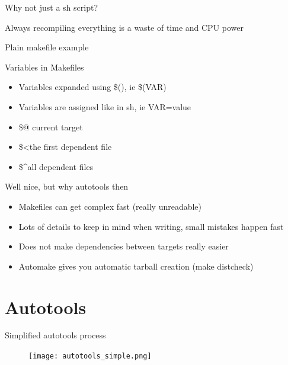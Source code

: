 \documentclass{beamer}
\begin{document}
\begin{frame}{Why not just a sh script?}
	\begin{center}
    \item Always recompiling everything is a waste of time and CPU power
	\end{center}
\end{frame}

\begin{frame}[t]{Plain makefile example}
	\begin{small}
	
	\end{small}
\end{frame}

\begin{frame}{Variables in Makefiles}
    \begin{itemize}
    \item Variables expanded using \$(), ie \$(VAR)
    \item Variables are assigned like in sh, ie VAR=value
    \item \$@ current target
    \item \$\textless the first dependent file
    \item \$\textasciicircum all dependent files
    \end{itemize}
\end{frame}

\begin{frame}{Well nice, but why autotools then}
    \begin{itemize}
    \item Makefiles can get complex fast (really unreadable)
    \item Lots of details to keep in mind when writing, small mistakes happen fast
    \item Does not make dependencies between targets really easier
    \item Automake gives you automatic tarball creation (make distcheck)
    \end{itemize}
\end{frame}

\section{Autotools}

\begin{frame}{Simplified autotools process}
	\begin{figure}
	\texttt{[image: autotools\_simple.png]}
	\end{figure}
\end{frame}
\end{document}
